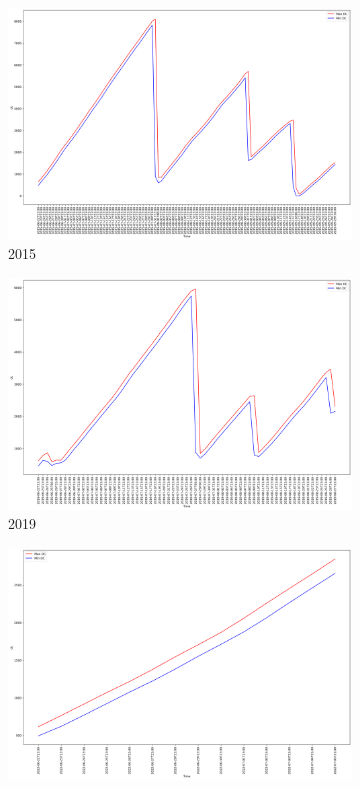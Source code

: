 \begin{figure}[h]
	\centering
	\caption{Daily max and min DC values}
	\begin{subfigure}{0.45\textwidth}
		\centering
		\includegraphics[width=\textwidth]{graphs/2015/byHour/DC_maxMin.png}
		\caption{2015}
	\end{subfigure}
	\hfill
	\begin{subfigure}{0.45\textwidth}
		\centering
		\includegraphics[width=\textwidth]{graphs/2019/byHour/DC_maxMin.png}
		\caption{2019}
	\end{subfigure}
	\hfill
	\begin{subfigure}{0.45\textwidth}
		\centering
		\includegraphics[width=\textwidth]{graphs/2022/DC_maxMin.png}

\end{subfigure}
\end{figure}
